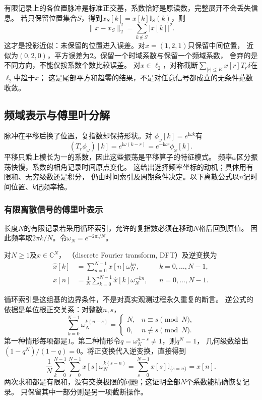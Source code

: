 有限记录上的各位置脉冲是标准正交基，系数恰好是原读数，完整展开不会丢失信息。
若只保留位置集合$S$，得到$x_S[k]=x[k]\mathbb I_S(k)$，则
\[
  \|x-x_S\|_2^2=\sum_{k\notin S}|x[k]|^2.
\]
这才是投影近似：未保留的位置进入误差。对$x=(1,2,1)$只保留中间位置，
近似为$(0,2,0)$，平方误差为$2$。保留一个时域系数与保留一个频域系数，
舍弃的是不同方向，不能仅按系数个数比较误差。
对$x\in\ell_2$，对称截断$\sum_{|r|\leq K}x[r]T_r\delta$在$\ell_2$中趋于$x$；
这是尾部平方和趋零的结果，不是对任意信号都成立的无条件范数收敛。

\subsection{频域表示与傅里叶分解}

脉冲在平移后换了位置，复指数却保持形状。对
$\phi_\omega[k]=e^{\mathrm i\omega k}$有
\[
  (T_r\phi_\omega)[k]
  =e^{\mathrm i\omega(k-r)}
  =e^{-\mathrm i\omega r}\phi_\omega[k].
\]
平移只乘上模长为一的系数，因此这些振荡是平移算子的特征模式。
频率$\omega$区分振荡快慢，系数的相角记录时间原点变化。
这给出选择频率坐标的动机；具体用有限和、无穷级数还是积分，
仍由时间索引及周期条件决定。以下离散公式以$n$记时间位置、$k$记频率格。

\subsubsection{有限离散信号的傅里叶表示}

长度$N$的有限记录若采用循环索引，允许的复指数必须在移动$N$格后回到原值。
因此频率取$2\pi k/N$。令$\omega_N=e^{-2\pi\mathrm i/N}$。
\begin{definition}[离散傅里叶变换]
  \label{def:signal-analysis-dft}
  对$N\geq1$及$x\in\mathbb C^N$，
  （discrete Fourier transform, DFT）及逆变换为
  \begin{align}
    \widehat x[k]&=\sum_{n=0}^{N-1}x[n]\omega_N^{kn},
    &&k=0,\ldots,N-1,
    \label{eq:signal-analysis-dft}\\
    x[n]&=\frac1N\sum_{k=0}^{N-1}\widehat x[k]\omega_N^{-kn},
    &&n=0,\ldots,N-1.
    \label{eq:signal-analysis-idft}
  \end{align}
\end{definition}
循环索引是这组基的边界条件，不是对真实观测过程永久重复的断言。
逆公式的依据是单位根正交关系：对整数$n,s$，
\begin{equation}
  \sum_{k=0}^{N-1}\omega_N^{k(n-s)}
  =
  \begin{cases}
    N,&n\equiv s\pmod N,\\
    0,&n\not\equiv s\pmod N.
  \end{cases}
  \label{eq:signal-analysis-root-orthogonality}
\end{equation}
第一种情形每项都是$1$。第二种情形令$q=\omega_N^{n-s}\neq1$，则$q^N=1$，
几何级数给出$(1-q^N)/(1-q)=0$。将正变换代入逆变换，直接得到
\[
  \frac1N\sum_{k=0}^{N-1}\sum_{s=0}^{N-1}x[s]\omega_N^{k(s-n)}
  =\sum_{s=0}^{N-1}x[s]\mathbb I_{\{s=n\}}=x[n].
\]
两次求和都是有限和，没有交换极限的问题；这证明全部$N$个系数能精确恢复记录。
只保留其中一部分则是另一项截断操作。

